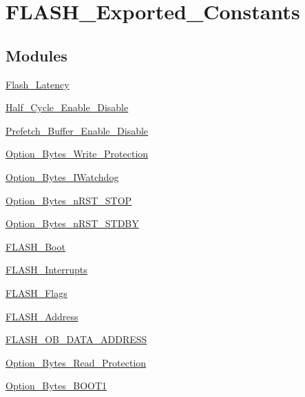 \hypertarget{group___f_l_a_s_h___exported___constants}{\section{F\-L\-A\-S\-H\-\_\-\-Exported\-\_\-\-Constants}
\label{group___f_l_a_s_h___exported___constants}
}
\subsection*{Modules}
\begin{DoxyCompactItemize}
\item 
\hyperlink{group___flash___latency}{Flash\-\_\-\-Latency}
\item 
\hyperlink{group___half___cycle___enable___disable}{Half\-\_\-\-Cycle\-\_\-\-Enable\-\_\-\-Disable}
\item 
\hyperlink{group___prefetch___buffer___enable___disable}{Prefetch\-\_\-\-Buffer\-\_\-\-Enable\-\_\-\-Disable}
\item 
\hyperlink{group___option___bytes___write___protection}{Option\-\_\-\-Bytes\-\_\-\-Write\-\_\-\-Protection}
\item 
\hyperlink{group___option___bytes___i_watchdog}{Option\-\_\-\-Bytes\-\_\-\-I\-Watchdog}
\item 
\hyperlink{group___option___bytes__n_r_s_t___s_t_o_p}{Option\-\_\-\-Bytes\-\_\-n\-R\-S\-T\-\_\-\-S\-T\-O\-P}
\item 
\hyperlink{group___option___bytes__n_r_s_t___s_t_d_b_y}{Option\-\_\-\-Bytes\-\_\-n\-R\-S\-T\-\_\-\-S\-T\-D\-B\-Y}
\item 
\hyperlink{group___f_l_a_s_h___boot}{F\-L\-A\-S\-H\-\_\-\-Boot}
\item 
\hyperlink{group___f_l_a_s_h___interrupts}{F\-L\-A\-S\-H\-\_\-\-Interrupts}
\item 
\hyperlink{group___f_l_a_s_h___flags}{F\-L\-A\-S\-H\-\_\-\-Flags}
\item 
\hyperlink{group___f_l_a_s_h___address}{F\-L\-A\-S\-H\-\_\-\-Address}
\item 
\hyperlink{group___f_l_a_s_h___o_b___d_a_t_a___a_d_d_r_e_s_s}{F\-L\-A\-S\-H\-\_\-\-O\-B\-\_\-\-D\-A\-T\-A\-\_\-\-A\-D\-D\-R\-E\-S\-S}
\item 
\hyperlink{group___option___bytes___read___protection}{Option\-\_\-\-Bytes\-\_\-\-Read\-\_\-\-Protection}
\item 
\hyperlink{group___option___bytes___b_o_o_t1}{Option\-\_\-\-Bytes\-\_\-\-B\-O\-O\-T1}

\end{DoxyCompactItemize}
